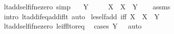 \begin{isabellebody}
\endisatagproof
{\isafoldproof}%
%
\isadelimproof
\isanewline
%
\endisadelimproof
\isanewline
{}\isamarkupfalse%
\ lt{\isacharunderscore}{\kern0pt}add{\isacharunderscore}{\kern0pt}self{\isacharunderscore}{\kern0pt}if{\isacharunderscore}{\kern0pt}ne{\isacharunderscore}{\kern0pt}zero\ {\isacharbrackleft}{\kern0pt}simp{\isacharbrackright}{\kern0pt}{\isacharcolon}{\kern0pt}\isanewline
\ \ \ {\isachardoublequoteopen}Y\ {\isasymnoteq}\ {}{\isachardoublequoteclose}\isanewline
\ \ \ {\isachardoublequoteopen}X\ {\isacharless}{\kern0pt}\ X\ {\isacharplus}{\kern0pt}\ Y{\isachardoublequoteclose}\isanewline
%
\isadelimproof
\ \ %
\endisadelimproof
%
\isatagproof
{}\isamarkupfalse%
\ assms\ \isamarkupfalse%
\ {\isacharparenleft}{\kern0pt}intro\ lt{\isacharunderscore}{\kern0pt}add{\isacharunderscore}{\kern0pt}if{\isacharunderscore}{\kern0pt}eq{\isacharunderscore}{\kern0pt}add{\isacharunderscore}{\kern0pt}if{\isacharunderscore}{\kern0pt}lt{\isacharparenright}{\kern0pt}\ auto%
\endisatagproof
{\isafoldproof}%
%
\isadelimproof
\isanewline
%
\endisadelimproof
\isanewline
{}\isamarkupfalse%
\ le{\isacharunderscore}{\kern0pt}self{\isacharunderscore}{\kern0pt}add\ {\isacharbrackleft}{\kern0pt}iff{\isacharbrackright}{\kern0pt}{\isacharcolon}{\kern0pt}\ {\isachardoublequoteopen}X\ {\isasymle}\ X\ {\isacharplus}{\kern0pt}\ Y{\isachardoublequoteclose}\isanewline
%
\isadelimproof
\ \ %
\endisadelimproof
%
\isatagproof
{}\isamarkupfalse%
\ lt{\isacharunderscore}{\kern0pt}add{\isacharunderscore}{\kern0pt}self{\isacharunderscore}{\kern0pt}if{\isacharunderscore}{\kern0pt}ne{\isacharunderscore}{\kern0pt}zero\ le{\isacharunderscore}{\kern0pt}iff{\isacharunderscore}{\kern0pt}lt{\isacharunderscore}{\kern0pt}or{\isacharunderscore}{\kern0pt}eq\ \isamarkupfalse%
\ {\isacharparenleft}{\kern0pt}cases\ {\isachardoublequoteopen}Y\ {\isacharequal}{\kern0pt}\ {}{\isachardoublequoteclose}{\isacharparenright}{\kern0pt}\ auto%
\endisatagproof
{\isafoldproof}%
%
\isadelimproof
\isanewline
%
\endisadelimproof
\isanewline
%
\isadelimtheory
\isanewline
%
\endisadelimtheory
%
\isatagtheory
{}\isamarkupfalse%
%
\endisatagtheory
{\isafoldtheory}%
%
\isadelimtheory
%
\endisadelimtheory
%
\end{isabellebody}%
\endinput
